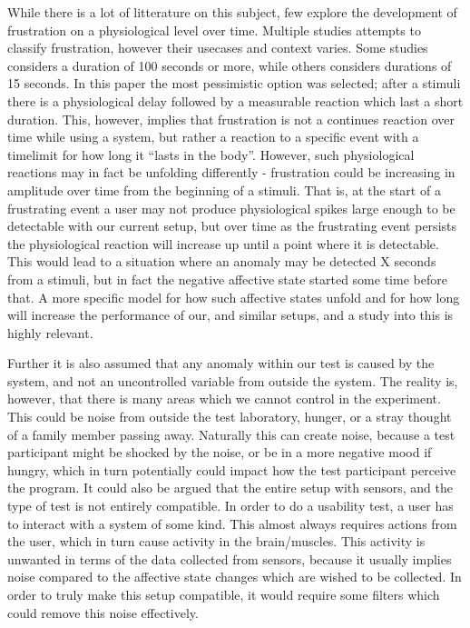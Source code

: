 While there is a lot of litterature on this subject, few explore the development of frustration on a physiological level
over time.  Multiple studies attempts to classify frustration, however their usecases and context varies.  Some studies
considers a duration of 100 seconds or more\cite{machine_learning_100s_gsr}, while others considers durations of 15
seconds\cite{brainwave_signals_frustration}.  In this paper the most pessimistic option was selected; after a stimuli
there is a physiological delay followed by a measurable reaction which last a short duration.  This, however, implies
that frustration is not a continues reaction over time while using a system, but rather a reaction to a specific event
with a timelimit for how long it ``lasts in the body''.  However, such physiological reactions may in fact be unfolding
differently - frustration could be increasing in amplitude over time from the beginning of a stimuli.  That is, at the
start of a frustrating event a user may not produce physiological spikes large enough to be detectable with our current
setup, but over time as the frustrating event persists the physiological reaction will increase up until a point where
it is detectable.  This would lead to a situation where an anomaly may be detected X seconds from a stimuli, but in fact
the negative affective state started some time before that.  A more specific model for how such affective states unfold
and for how long will increase the performance of our, and similar setups, and a study into this is highly relevant.

Further it is also assumed that any anomaly within our test is caused by the system, and not an uncontrolled variable from outside the system. 
The reality is, however, that there is many areas which we cannot control in the experiment.
This could be noise from outside the test laboratory, hunger, or a stray thought of a family member passing away.
Naturally this can create noise, because a test participant might be shocked by the noise, or be in a more negative mood if hungry, which in turn potentially could impact how the test participant perceive the program. 
It could also be argued that the entire setup with sensors, and the type of test is not entirely compatible. 
In order to do a usability test, a user has to interact with a system of some kind. 
This almost always requires actions from the user, which in turn cause activity in the brain/muscles. 
This activity is unwanted in terms of the data collected from sensors, because it usually implies noise compared to the affective state changes which are wished to be collected. In order to truly make this setup compatible, it would require some filters which could remove this noise effectively.

